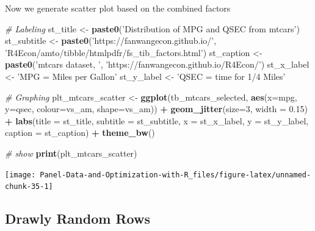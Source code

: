 \documentclass[
]{book}
\newenvironment{Shaded}{\begin{snugshade}}{\end{snugshade}}
\newcommand{\CommentTok}[1]{\textcolor[rgb]{0.56,0.35,0.01}{\textit{#1}}}
\newcommand{\DataTypeTok}[1]{\textcolor[rgb]{0.13,0.29,0.53}{#1}}
\newcommand{\DecValTok}[1]{\textcolor[rgb]{0.00,0.00,0.81}{#1}}
\newcommand{\FloatTok}[1]{\textcolor[rgb]{0.00,0.00,0.81}{#1}}
\newcommand{\KeywordTok}[1]{\textcolor[rgb]{0.13,0.29,0.53}{\textbf{#1}}}
\newcommand{\NormalTok}[1]{#1}
\newcommand{\OperatorTok}[1]{\textcolor[rgb]{0.81,0.36,0.00}{\textbf{#1}}}
\newcommand{\StringTok}[1]{\textcolor[rgb]{0.31,0.60,0.02}{#1}}
\begin{document}
Now we generate scatter plot based on the combined factors

\begin{Shaded}
\begin{Highlighting}[]
\CommentTok{# Labeling}
\NormalTok{st_title <-}\StringTok{ }\KeywordTok{paste0}\NormalTok{(}\StringTok{'Distribution of MPG and QSEC from mtcars'}\NormalTok{)}
\NormalTok{st_subtitle <-}\StringTok{ }\KeywordTok{paste0}\NormalTok{(}\StringTok{'https://fanwangecon.github.io/'}\NormalTok{,}
                      \StringTok{'R4Econ/amto/tibble/htmlpdfr/fs_tib_factors.html'}\NormalTok{)}
\NormalTok{st_caption <-}\StringTok{ }\KeywordTok{paste0}\NormalTok{(}\StringTok{'mtcars dataset, '}\NormalTok{,}
                     \StringTok{'https://fanwangecon.github.io/R4Econ/'}\NormalTok{)}
\NormalTok{st_x_label <-}\StringTok{ 'MPG = Miles per Gallon'}
\NormalTok{st_y_label <-}\StringTok{ 'QSEC = time for 1/4 Miles'}

\CommentTok{# Graphing}
\NormalTok{plt_mtcars_scatter <-}\StringTok{ }
\StringTok{  }\KeywordTok{ggplot}\NormalTok{(tb_mtcars_selected, }
         \KeywordTok{aes}\NormalTok{(}\DataTypeTok{x=}\NormalTok{mpg, }\DataTypeTok{y=}\NormalTok{qsec, }\DataTypeTok{colour=}\NormalTok{vs_am, }\DataTypeTok{shape=}\NormalTok{vs_am)) }\OperatorTok{+}
\StringTok{  }\KeywordTok{geom_jitter}\NormalTok{(}\DataTypeTok{size=}\DecValTok{3}\NormalTok{, }\DataTypeTok{width =} \FloatTok{0.15}\NormalTok{) }\OperatorTok{+}
\StringTok{  }\KeywordTok{labs}\NormalTok{(}\DataTypeTok{title =}\NormalTok{ st_title, }\DataTypeTok{subtitle =}\NormalTok{ st_subtitle,}
       \DataTypeTok{x =}\NormalTok{ st_x_label, }\DataTypeTok{y =}\NormalTok{ st_y_label, }\DataTypeTok{caption =}\NormalTok{ st_caption) }\OperatorTok{+}
\StringTok{  }\KeywordTok{theme_bw}\NormalTok{()}

\CommentTok{# show}
\KeywordTok{print}\NormalTok{(plt_mtcars_scatter)}
\end{Highlighting}
\end{Shaded}

\begin{center}\texttt{[image: Panel-Data-and-Optimization-with-R\_files/figure-latex/unnamed-chunk-35-1]} \end{center}

\hypertarget{drawly-random-rows}{%
\subsection{Drawly Random Rows}\label{drawly-random-rows}}
\end{document}

